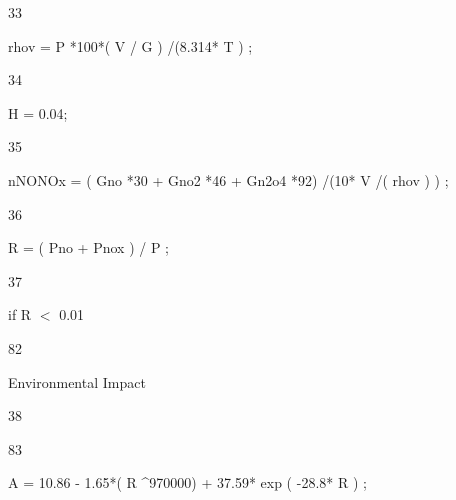 \documentclass[a4paper,portrait,12pt]{article}
\begin{document}
33





\begin{flushleft}
rhov = P *100*( V / G ) /(8.314* T ) ;
\end{flushleft}





34





\begin{flushleft}
H = 0.04;
\end{flushleft}





35





\begin{flushleft}
nNONOx = ( Gno *30 + Gno2 *46 + Gn2o4 *92) /(10* V /( rhov ) ) ;
\end{flushleft}





36





\begin{flushleft}
R = ( Pno + Pnox ) / P ;
\end{flushleft}





37





\begin{flushleft}
if R $<$ 0.01
\end{flushleft}





82





\begin{flushleft}
\newpage
Environmental Impact
\end{flushleft}


38





83





\begin{flushleft}
A = 10.86 - 1.65*( R \^{}970000) + 37.59* exp ( -28.8* R ) ;
\end{flushleft}
\end{document}
